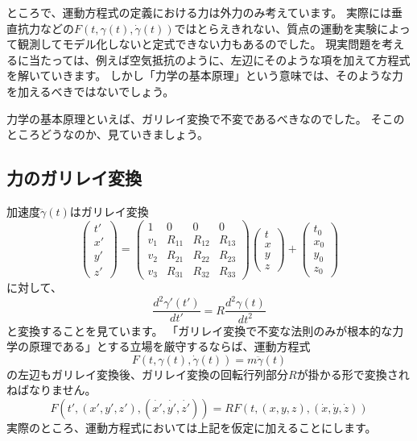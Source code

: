 ところで、運動方程式の定義における力は外力のみ考えています。
実際には垂直抗力などの$F(t,\gamma(t),\dot\gamma(t))$ではとらえきれない、質点の運動を実験によって観測してモデル化しないと定式できない力もあるのでした。
現実問題を考えるに当たっては、例えば空気抵抗のように、左辺にそのような項を加えて方程式を解いていきます。
しかし「力学の基本原理」という意味では、そのような力を加えるべきではないでしょう。

力学の基本原理といえば、ガリレイ変換で不変であるべきなのでした。
そこのところどうなのか、見ていきましょう。

\subsection{力のガリレイ変換}

加速度$\ddot\gamma(t)$はガリレイ変換
\[
  \begin{pmatrix}
    t'\\x'\\y'\\z'
  \end{pmatrix}
  =
  \begin{pmatrix}
    1 & 0 & 0 & 0 \\
    v_1 & R_{11} & R_{12} & R_{13} \\
    v_2 & R_{21} & R_{22} & R_{23} \\
    v_3 & R_{31} & R_{32} & R_{33}
  \end{pmatrix}
  \begin{pmatrix}
    t\\x\\y\\z
  \end{pmatrix}
  +
  \begin{pmatrix}
    t_0\\x_0\\y_0\\z_0
  \end{pmatrix}
\]
に対して、
\[
  \frac{d^2\gamma'(t')}{dt'}=R\frac{d^2\gamma(t)}{dt^2}
\]
と変換することを見ています。
「ガリレイ変換で不変な法則のみが根本的な力学の原理である」とする立場を厳守するならば、運動方程式
\[
  F(t,\gamma(t),\dot\gamma(t))=m\ddot\gamma(t)
\]
の左辺もガリレイ変換後、ガリレイ変換の回転行列部分$R$が掛かる形で変換されねばなりません。
\[
  F(t',(x',y',z'),(\dot{x'},\dot{y'},\dot{z'}))=RF(t,(x,y,z),(\dot{x},\dot{y},\dot{z}))
\]
実際のところ、運動方程式においては上記を仮定に加えることにします。
